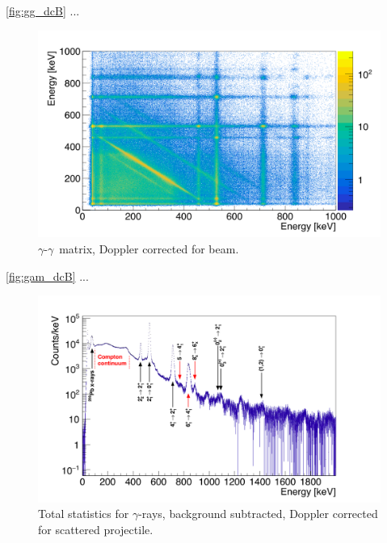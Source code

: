\documentclass[twoside,english]{uiofysmaster/uiofysmaster}
\newcommand{\ga}{$\gamma$}
\let\orgautoref\autoref
\renewcommand{\autoref}
        {%
		 \def\sectionautorefname{Section}%
		 \def\subsectionautorefname{Section}%
		 \def\subsubsectionautorefname{Section}%
		 \def\chapterautorefname{Chapter}%
          \orgautoref}
\begin{document}
\bigskip

\autoref{fig:gg_dcB} ...

\begin{figure}[ht]
	\centering
	\includegraphics[width=\textwidth]{../Plots/plotting/gg_dcB.png}
	\caption{\ga-\ga\ matrix, Doppler corrected for beam.}
	\label{fig:gg_dcB}
\end{figure}


\autoref{fig:gam_dcB} ...

\begin{figure}[ht]
	\centering
	\includegraphics[width=\textwidth]{../Plots/plotting/gam_dcB.png}
	\caption{Total statistics for \ga-rays, 
      background subtracted, Doppler corrected for scattered projectile.}
	\label{fig:gam_dcB}
\end{figure}



\end{document}
